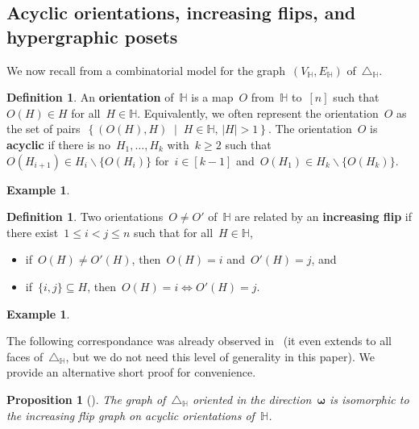 \documentclass[reqno]{amsart}
\newtheorem{proposition}[theorem]{Proposition}
\theoremstyle{definition}
\newtheorem{definition}[theorem]{Definition}
\newtheorem{example}[theorem]{Example}
\renewcommand{\b}[1]{\boldsymbol{#1}} %
\newcommand{\set}[2]{\left\{ #1 \;\middle|\; #2 \right\}} %
\newcommand{\ssm}{\smallsetminus} %
\newcommand{\simplex}{\triangle} %
\newcommand{\defn}[1]{\textbf{\textsf{\color{PineGreen} #1}}} %
\newcommand{\vincent}[1]{\todo[color=blue!30]{#1 \\ \hfill --- V.}}
\newcommand{\HH}{\mathbb H}  %
\begin{document}

\subsection{Acyclic orientations, increasing flips, and hypergraphic posets} 
\label{subsec:P_H}

We now recall from \cite[Thm.~2.18]{BenedettiBergeronMachacek} a combinatorial model for the graph~$(V_\HH, E_\HH)$ of~$\simplex_\HH$.

\begin{definition}
\label{def:acyclicOrientation}
An \defn{orientation} of~$\HH$ is a map~$O$ from~$\HH$ to~$[n]$ such that~$O(H) \in H$ for all~${H \in \HH}$.
Equivalently, we often represent the orientation~$O$ as the set of pairs~$\set{(O(H),H)}{H \in \HH, \, |H| > 1}$.
The orientation~$O$ is \defn{acyclic} if there is no~$H_1, \dots, H_k$ with~$k \ge 2$ such that~$O(H_{i+1}) \in H_i \ssm \{O(H_i)\}$ for~$i \in [k-1]$ and~$O(H_1) \in H_k \ssm \{O(H_k)\}$.
\end{definition}

\begin{example}
\vincent{todo}
\end{example}

\begin{definition}
\label{def:flip}
Two orientations~$O \ne O'$ of~$\HH$ are related by an \defn{increasing flip} if there exist~${1 \le i < j \le n}$ such that for all~$H \in \HH$, 
\begin{itemize}
\item if~$O(H) \ne O'(H)$, then~$O(H) = i$ and~$O'(H) = j$, and
\item if~$\{i,j\} \subseteq H$, then~$O(H) = i \iff O'(H) = j$.
\end{itemize}
\end{definition}

\begin{example}
\vincent{todo}
\end{example}

The following correspondance was already observed in~\cite[Thm.~2.18]{BenedettiBergeronMachacek} (it even extends to all faces of~$\simplex_\HH$, but we do not need this level of generality in this paper).
We provide an alternative short proof for convenience.

\begin{proposition}[{\cite[Thm.~2.18]{BenedettiBergeronMachacek}}]
\label{prop:Hgraph}
The graph of~$\simplex_\HH$ oriented in the direction~$\b{\omega}$ is isomorphic to the increasing flip graph on acyclic orientations of~$\HH$.
\end{proposition}
\end{document}
